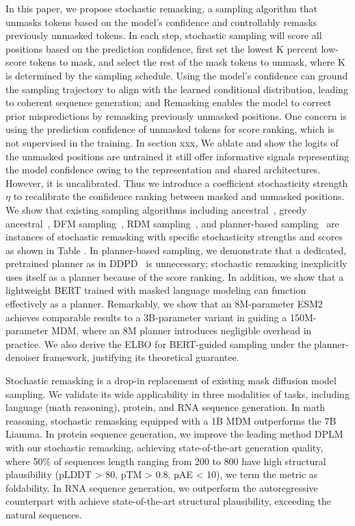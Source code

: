 In this paper, we propose stochastic remasking,
a sampling algorithm that unmasks tokens based on the model's confidence and controllably remasks previously unmasked tokens. In each step, stochastic sampling will score all positions based on the prediction confidence, first set the lowest K percent low-score tokens to mask, and select the rest of the mask tokens to unmask, where K is determined by the sampling schedule.
Using the model's confidence can ground the sampling trajectory to align with the learned conditional distribution, leading to coherent sequence generation; and Remasking enables the model to correct prior mispredictions by remasking previously unmasked positions. One concern is using the prediction confidence of unmasked tokens for score ranking, which is not supervised in the training. In section xxx, We ablate and show the logits of the unmasked positions are untrained it still offer informative signals representing the model confidence owing to the representation and shared architectures. However, it is uncalibrated. Thus we introduce a coefficient stochasticity strength $\eta$ to recalibrate the confidence ranking between masked and unmasked positions.
We show that existing sampling algorithms including ancestral~\citep{md4, mdlm}, greedy ancestral~\citep{gong2024scalingdiffusionlanguagemodels,Chang_2022_CVPR}, DFM sampling~\citep{DFM}, RDM sampling~\citep{RDM,DPLM,DPLM2}, and planner-based sampling~\citep{DDPD} are instances of stochastic remasking with specific stochasticity strengths and scores as shown in Table . In planner-based sampling, we demonstrate that a dedicated, pretrained planner as in DDPD~\citep{DDPD} is unnecessary; stochastic remasking inexplicitly uses itself as a planner because of the score ranking. In addition, we show that a lightweight BERT trained with masked language modeling can function effectively as a planner. Remarkably, we show that an 8M-parameter ESM2~\citep{esm2} achieves comparable results to a 3B-parameter variant in guiding a 150M-parameter MDM, where an 8M planner introduces negligible overhead in practice. We also derive the ELBO for BERT-guided sampling under the planner-denoiser framework, justifying its theoretical guarantee. 

Stochastic remasking is a drop-in replacement of existing mask diffusion model sampling. We validate its wide applicability in three modalities of tasks, including language (math reasoning), protein, and RNA sequence generation. In math reasoning, stochastic remasking equipped with a 1B MDM outperforms the 7B Liamma. In protein sequence generation, we improve the leading method DPLM with our stochastic remasking, achieving state-of-the-art generation quality, where 50\% of sequences length ranging from 200 to 800 have high structural plausibility (pLDDT > 80, pTM > 0.8, pAE < 10), we term the metric as foldability. In RNA sequence generation, we outperform the autoregressive counterpart with achieve state-of-the-art structural plausibility, exceeding the natural sequences. 
